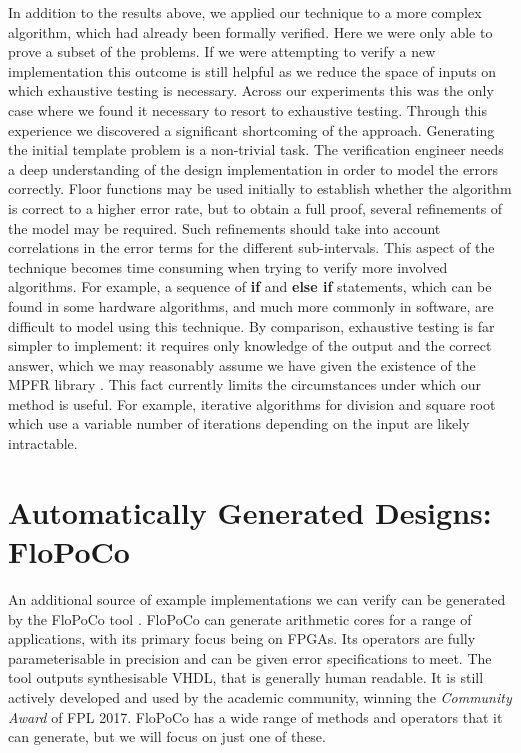 \documentclass{fac}
\begin{document}
In addition to the results above, we applied our technique to a more complex algorithm, which had already been formally verified. Here we were only able to prove a subset of the problems. If we were attempting to verify a new implementation this outcome is still helpful as we reduce the space of inputs on which exhaustive testing is necessary. Across our experiments this was the only case where we found it necessary to resort to exhaustive testing. Through this experience we discovered a significant shortcoming of the approach. Generating the initial template problem is a non-trivial task. The verification engineer needs a deep understanding of the design implementation in order to model the errors correctly. Floor functions may be used initially to establish whether the algorithm is correct to a higher error rate, but to obtain a full proof, several refinements of the model may be required. Such refinements should take into account correlations in the error terms for the different sub-intervals. This aspect of the technique becomes time consuming when trying to verify more involved algorithms. For example, a sequence of \textbf{if} and \textbf{else if} statements, which can be found in some hardware algorithms, and much more commonly in software, are difficult to model using this technique. By comparison, exhaustive testing is far simpler to implement: it requires only knowledge of the output and the correct answer, which we may reasonably assume we have given the existence of the MPFR library \cite{fousse2007mpfr}. This fact currently limits the circumstances under which our method is useful. For example, iterative algorithms for division and square root which use a variable number of iterations depending on the input are likely intractable. 


\section{Automatically Generated Designs: FloPoCo}
\label{flopoco}
An additional source of example implementations we can verify can be generated by the FloPoCo tool \cite{DinechinPasca2011-DaT}. FloPoCo can generate arithmetic cores for a range of applications, with its primary focus being on FPGAs. Its operators are fully parameterisable in precision and can be given error specifications to meet. The tool outputs synthesisable VHDL, that is generally human readable. It is still actively developed and used by the academic community, winning the \textit{Community Award} of FPL 2017. FloPoCo has a wide range of methods and operators that it can generate, but we will focus on just one of these.
\end{document}
